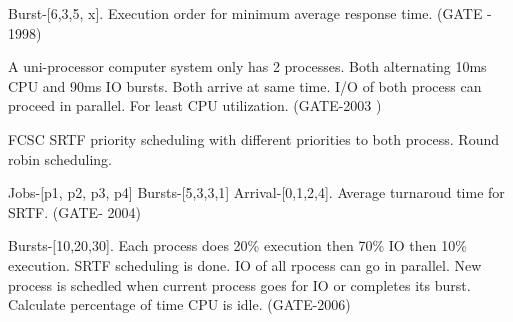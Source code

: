 

\begin{questyle}

  \question  Burst-[6,3,5, x]. Execution order for minimum average response time. (GATE - 1998)


  \end{questyle}





\begin{questyle}

  \question  A uni-processor computer system only has 2 processes. Both alternating 10ms CPU and 90ms IO bursts.
             Both arrive at same time. I/O of both process can proceed in parallel. For least CPU utilization. (GATE-2003 )

  \begin{choices}
    \choice FCSC
    \choice SRTF
    \choice priority scheduling with different priorities to both process.
    \choice Round robin scheduling.
  \end{choices}


  \end{questyle}





\begin{questyle}

  \question  Jobs-[p1, p2, p3, p4] Bursts-[5,3,3,1] Arrival-[0,1,2,4]. Average turnaroud time for SRTF. (GATE- 2004)

  \begin{oneparchoices}
  \end{oneparchoices}

  \end{questyle}





\begin{questyle}

  \question  Bursts-[10,20,30]. Each process does 20\% execution then 70\% IO then 10\% execution.
             SRTF scheduling is done. IO of all rpocess can go in parallel. New process is
             schedled when current process goes for IO or completes its burst.
             Calculate percentage of time CPU is idle. (GATE-2006)

  \begin{oneparchoices}
  \end{oneparchoices}

  \end{questyle}




